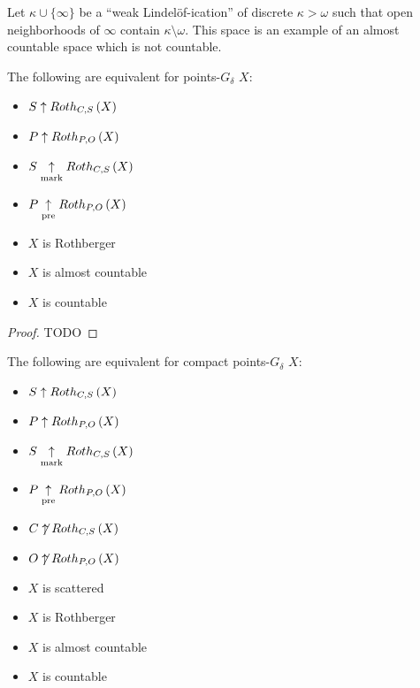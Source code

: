 Let $\kappa\cup\{\infty\}$ be a ``weak Lindel\"of-ication'' of
discrete $\kappa>\omega$ such that open neighborhoods of $\infty$ contain
$\kappa\setminus\omega$. This space is an example of an almost countable
space which is not countable.

\begin{thm}
  The following are equivalent for points-$G_\delta$ $X$:
    \begin{itemize}
      \item $S\uparrow Roth_{C,S}\left({X}\right)$
      \item $P\uparrow Roth_{P,O}\left({X}\right)$
      \item $S\underset{\text{mark}}{\uparrow}Roth_{C,S}\left({X}\right)$
      \item $P\underset{\text{pre}}{\uparrow}Roth_{P,O}\left({X}\right)$
      \item $X$ is Rothberger
      \item $X$ is almost countable
      \item $X$ is countable
    \end{itemize}
\end{thm}

\begin{proof}
  TODO
\end{proof}

\begin{cor}
  The following are equivalent for compact points-$G_\delta$ $X$:
    \begin{itemize}
      \item $S\uparrow Roth_{C,S}\left({X}\right)$
      \item $P\uparrow Roth_{P,O}\left({X}\right)$
      \item $S\underset{\text{mark}}{\uparrow}Roth_{C,S}\left({X}\right)$
      \item $P\underset{\text{pre}}{\uparrow}Roth_{P,O}\left({X}\right)$
      \item $C\not\uparrow Roth_{C,S}\left({X}\right)$
      \item $O\not\uparrow Roth_{P,O}\left({X}\right)$
      \item $X$ is scattered
      \item $X$ is Rothberger
      \item $X$ is almost countable
      \item $X$ is countable
    \end{itemize}
\end{cor}